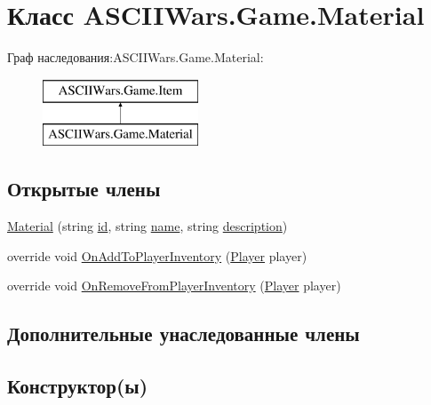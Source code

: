\hypertarget{class_a_s_c_i_i_wars_1_1_game_1_1_material}{}\section{Класс A\+S\+C\+I\+I\+Wars.\+Game.\+Material}
\label{class_a_s_c_i_i_wars_1_1_game_1_1_material}
Граф наследования\+:A\+S\+C\+I\+I\+Wars.\+Game.\+Material\+:\begin{figure}[H]
\begin{center}
\leavevmode
\includegraphics[height=2.000000cm]{class_a_s_c_i_i_wars_1_1_game_1_1_material}
\end{center}
\end{figure}
\subsection*{Открытые члены}
\begin{DoxyCompactItemize}
\item 
\hyperlink{class_a_s_c_i_i_wars_1_1_game_1_1_material_aa4aee4341c8099508c7ef1f980163e1d}{Material} (string \hyperlink{class_a_s_c_i_i_wars_1_1_game_1_1_item_a744d51f7684a4e46a1f834f8666db58e}{id}, string \hyperlink{class_a_s_c_i_i_wars_1_1_game_1_1_item_a994b9ec5f10c123e4345da159c090091}{name}, string \hyperlink{class_a_s_c_i_i_wars_1_1_game_1_1_item_a6ff41e953ccebc64a8df8f8c434535a0}{description})
\item 
override void \hyperlink{class_a_s_c_i_i_wars_1_1_game_1_1_material_afedb9d9b8b22782e40371b6cac37d27e}{On\+Add\+To\+Player\+Inventory} (\hyperlink{class_a_s_c_i_i_wars_1_1_game_1_1_player}{Player} player)
\item 
override void \hyperlink{class_a_s_c_i_i_wars_1_1_game_1_1_material_ab8467edc48ff6af4021f550c97cbec31}{On\+Remove\+From\+Player\+Inventory} (\hyperlink{class_a_s_c_i_i_wars_1_1_game_1_1_player}{Player} player)
\end{DoxyCompactItemize}
\subsection*{Дополнительные унаследованные члены}


\subsection{Конструктор(ы)}
\hypertarget{class_a_s_c_i_i_wars_1_1_game_1_1_material_aa4aee4341c8099508c7ef1f980163e1d}{}\label{class_a_s_c_i_i_wars_1_1_game_1_1_material_aa4aee4341c8099508c7ef1f980163e1d} 
